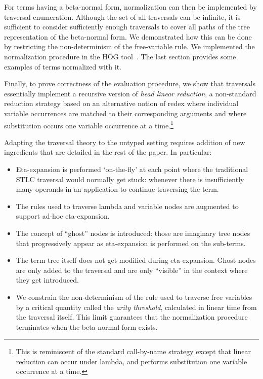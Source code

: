\documentclass{elsarticle}
\theoremstyle{plain}
\theoremstyle{definition}
\theoremstyle{remark}
\begin{document}
For terms having a beta-normal form, normalization can then be implemented by traversal enumeration. Although the set of all traversals can be infinite, it is sufficient to consider sufficiently enough traversals to cover all paths of the tree representation of the beta-normal form. We demonstrated how this can be done by restricting the non-determinism of the free-variable rule.
We implemented the normalization procedure in the HOG tool~\cite{Blum-HogTool}. The last section provides some examples of terms normalized with it.

Finally, to prove correctness of the evaluation procedure, we show that traversals essentially implement a recursive version of \emph{head linear reduction}, a non-standard reduction strategy based on an alternative notion of redex where individual variable occurrences are matched to their corresponding arguments and where substitution occurs one variable occurrence at a time.\footnote{This is reminiscent of the standard call-by-name strategy except that linear reduction can occur under lambda, and performs substitution one variable occurrence at a time.}


Adapting the traversal theory to the untyped setting requires addition of new ingredients that are detailed in the rest of the paper. In particular:
\begin{itemize}[nosep]
 \item Eta-expansion is performed `on-the-fly' at each point where the traditional STLC traversal would normally get stuck: whenever there is insufficiently many operands in an application to continue traversing the term.
 \item  The rules used to traverse lambda and variable nodes are augmented to support ad-hoc eta-expansion.
 \item The concept of ``ghost'' nodes is introduced: those are imaginary tree nodes that progressively appear as eta-expansion is performed on the sub-terms.
\item The term tree itself does not get modified during eta-expansion. Ghost nodes are only added to the traversal and are only ``visible'' in the context where they get introduced.
\item We constrain the non-determinism of the rule used to traverse free variables by a critical quantity called the \emph{arity threshold}, calculated in linear time from the traversal itself. This limit guarantees that the normalization procedure terminates when the beta-normal form exists.
\end{itemize}
\end{document}
